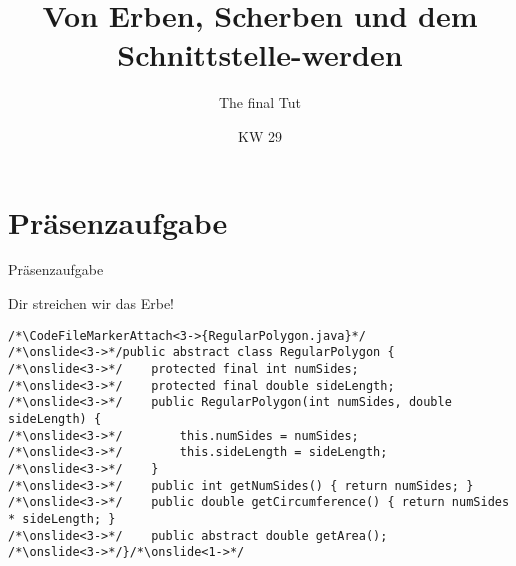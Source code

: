 \relax\relax

\iffull
\title{Von Erben, Scherben und dem Schnittstelle-werden}
\subtitle{The final Tut}
\date{KW 29}

\fi
{}

\iffull
\titleframe

\fi

\fi

\section{Präsenzaufgabe}
{
\begin{frame}[fragile,c]{Präsenzaufgabe}
\begin{aufgabe}{Dir streichen wir das Erbe!}
%
%
\begin{verbatim}
/*\CodeFileMarkerAttach<3->{RegularPolygon.java}*/
/*\onslide<3->*/public abstract class RegularPolygon {
/*\onslide<3->*/    protected final int numSides;
/*\onslide<3->*/    protected final double sideLength;
/*\onslide<3->*/    public RegularPolygon(int numSides, double sideLength) {
/*\onslide<3->*/        this.numSides = numSides;
/*\onslide<3->*/        this.sideLength = sideLength;
/*\onslide<3->*/    }
/*\onslide<3->*/    public int getNumSides() { return numSides; }
/*\onslide<3->*/    public double getCircumference() { return numSides * sideLength; }
/*\onslide<3->*/    public abstract double getArea();
/*\onslide<3->*/}/*\onslide<1->*/
\end{verbatim}\vspace*{-.5\baselineskip}\par
\footnotesize{}\vspace*{-.45\baselineskip}
\end{aufgabe}
\end{frame}
}


